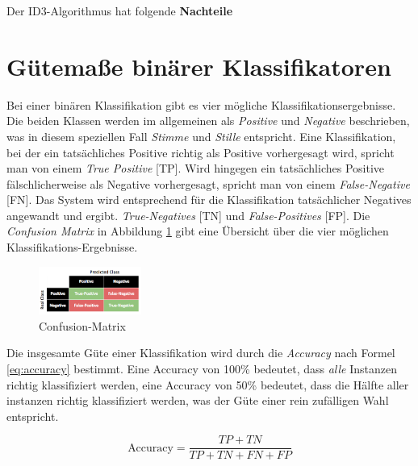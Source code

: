 Der ID3-Algorithmus hat folgende \textbf{Nachteile}


\section{Gütemaße binärer Klassifikatoren}

Bei einer binären Klassifikation gibt es vier mögliche Klassifikationsergebnisse. Die beiden Klassen werden im allgemeinen als \emph{Positive} und \emph{Negative} beschrieben, was in diesem speziellen Fall \emph{Stimme} und \emph{Stille} entspricht. Eine Klassifikation, bei der ein tatsächliches Positive richtig als Positive vorhergesagt wird, spricht man von einem \emph{True Positive} [TP]. Wird hingegen ein tatsächliches Positive fälschlicherweise als Negative vorhergesagt, spricht man von einem \emph{False-Negative} [FN]. Das System wird entsprechend für die Klassifikation tatsächlicher Negatives angewandt und ergibt. \emph{True-Negatives} [TN] und \emph{False-Positives} [FP]. Die \emph{Confusion Matrix} in Abbildung \ref{img:Confusion-Matrix} gibt eine Übersicht über die vier möglichen Klassifikations-Ergebnisse.

\begin{figure}[h]
	\centering
	\includegraphics[width=0.3\textwidth]{bilder/Confusion-Matrix.png}
	\caption{Confusion-Matrix}
	\label{img:Confusion-Matrix}
\end{figure}

Die insgesamte Güte einer Klassifikation wird durch die \emph{Accuracy} nach Formel \ref{eq:accuracy} bestimmt. Eine Accuracy von 100\% bedeutet, dass \emph{alle} Instanzen richtig klassifiziert werden, eine Accuracy von 50\% bedeutet, dass die Hälfte aller instanzen richtig klassifiziert werden, was der Güte einer rein zufälligen Wahl entspricht.

\begin{equation}
\text{Accuracy} = \frac{TP+TN}{TP+TN+FN+FP}
\label{eq:accuracy}
\end{equation}


